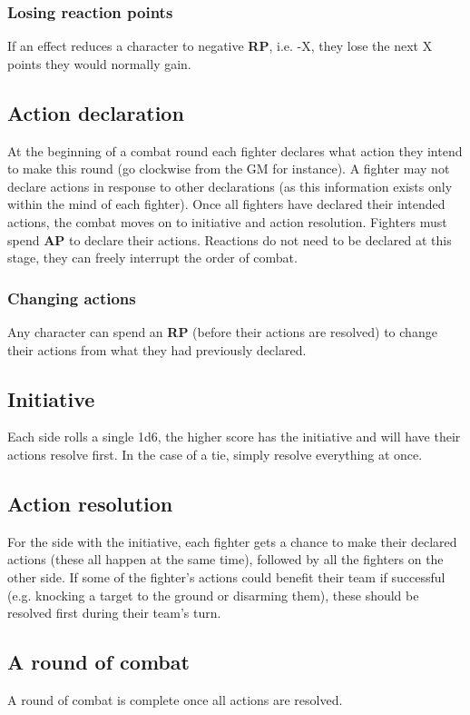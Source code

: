 \documentclass[a4paper,10pt,oneside]{book}
\begin{document}
\subsubsection{Losing reaction points}
If an effect reduces a character to negative \textbf{RP}, i.e. -X, they lose the next X points they would normally gain.

\subsection{Action declaration}
At the beginning of a combat round each fighter declares what action they intend to make this round (go clockwise from the GM for instance). A fighter may not declare actions in response to other declarations (as this information exists only within the mind of each fighter). Once all fighters have declared their intended actions, the combat moves on to initiative and action resolution. Fighters must spend \textbf{AP} to declare their actions. Reactions do not need to be declared at this stage, they can freely interrupt the order of combat.

\subsubsection{Changing actions}
Any character can spend an \textbf{RP} (before their actions are resolved) to change their actions from what they had previously declared. 

\subsection{Initiative}
Each side rolls a single 1d6, the higher score has the initiative and will have their actions resolve first. In the case of a tie, simply resolve everything at once.

\subsection{Action resolution}
For the side with the initiative, each fighter gets a chance to make their declared actions (these all happen at the same time), followed by all the fighters on the other side. If some of the fighter's actions could benefit their team if successful (e.g. knocking a target to the ground or disarming them), these should be resolved first during their team's turn.

\subsection{A round of combat}
A round of combat is complete once all actions are resolved. 
\end{document}
